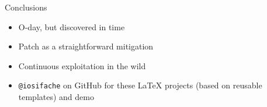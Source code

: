 \documentclass{beamer}
\begin{document}
\begin{frame}{Conclusions} \pause
	\begin{itemize}
		\item O-day, but discovered in time \pause
	    \item Patch as a straightforward mitigation \pause
	    \item Continuous exploitation in the wild \pause
	    \item \texttt{@iosifache} on GitHub for these LaTeX projects (based on reusable templates) and demo
	\end{itemize}
\end{frame}
\end{document}
